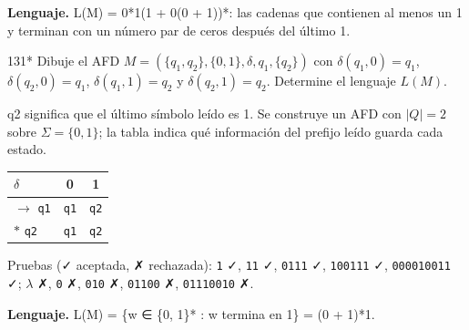 \documentclass[11pt]{article}
\begin{document}
\textbf{Lenguaje.} L(M) = 0*1(1 + 0(0 + 1))*: las cadenas que contienen al menos un 1 y terminan con un número par de ceros después del último 1.



\begin{ejercicio}{131}{*}
Dibuje el AFD $M = (\{q_1, q_2\}, \{0, 1\}, \delta, q_1, \{q_2\})$ con $\delta(q_1,0)=q_1$, $\delta(q_2,0)=q_1$, $\delta(q_1,1)=q_2$ y $\delta(q_2,1)=q_2$. Determine el lenguaje $L(M)$.
\end{ejercicio}
\proc q2 significa que el último símbolo leído es 1. Se construye un AFD con $|Q| = 2$ sobre $\Sigma = \{0, 1\}$; la tabla indica qué información del prefijo leído guarda cada estado.
\begin{center}\small\begin{tabular}{lcc}\toprule
$\delta$ & 0 & 1 \\\midrule
$\to$ \texttt{q1} & \texttt{q1} & \texttt{q2} \\
$*$ \texttt{q2} & \texttt{q1} & \texttt{q2} \\
\bottomrule\end{tabular}\end{center}
Pruebas (✓ aceptada, ✗ rechazada): \texttt{1} ✓, \texttt{11} ✓, \texttt{0111} ✓, \texttt{100111} ✓, \texttt{000010011} ✓; $\lambda$ ✗, \texttt{0} ✗, \texttt{010} ✗, \texttt{01100} ✗, \texttt{01110010} ✗.


\textbf{Lenguaje.} L(M) = \{w ∈ \{0, 1\}* : w termina en 1\} = (0 + 1)*1.
\end{document}
